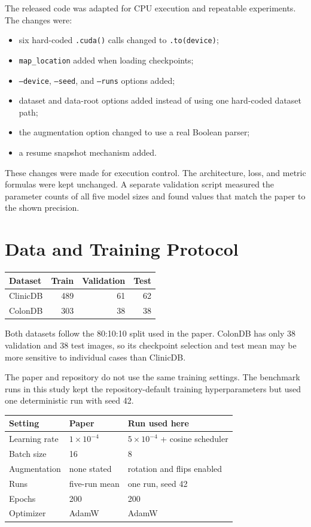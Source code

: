 \documentclass[10pt,a4paper]{article}
\begin{document}
The released code was adapted for CPU execution and repeatable experiments. The changes were:

\begin{itemize}
\item six hard-coded \texttt{.cuda()} calls changed to \texttt{.to(device)};
\item \texttt{map\_location} added when loading checkpoints;
\item \texttt{--device}, \texttt{--seed}, and \texttt{--runs} options added;
\item dataset and data-root options added instead of using one hard-coded dataset path;
\item the augmentation option changed to use a real Boolean parser;
\item a resume snapshot mechanism added.
\end{itemize}

These changes were made for execution control. The architecture, loss, and metric formulas were kept unchanged. A separate validation script measured the parameter counts of all five model sizes and found values that match the paper to the shown precision.

\section{Data and Training Protocol}

\begin{table}[h]
\centering\small
\begin{tabular}{@{}lrrr@{}}
\toprule
Dataset & Train & Validation & Test \\
\midrule
ClinicDB & 489 & 61 & 62 \\
ColonDB & 303 & 38 & 38 \\
\bottomrule
\end{tabular}
\end{table}

Both datasets follow the 80:10:10 split used in the paper. ColonDB has only 38 validation and 38 test images, so its checkpoint selection and test mean may be more sensitive to individual cases than ClinicDB.

The paper and repository do not use the same training settings. The benchmark runs in this study kept the repository-default training hyperparameters but used one deterministic run with seed 42.

\begin{table}[h]
\centering\small
\begin{tabular}{@{}lll@{}}
\toprule
Setting & Paper & Run used here \\
\midrule
Learning rate & $1\times10^{-4}$ & $5\times10^{-4}$ + cosine scheduler \\
Batch size & 16 & 8 \\
Augmentation & none stated & rotation and flips enabled \\
Runs & five-run mean & one run, seed 42 \\
Epochs & 200 & 200 \\
Optimizer & AdamW & AdamW \\
\bottomrule
\end{tabular}
\end{table}
\end{document}

